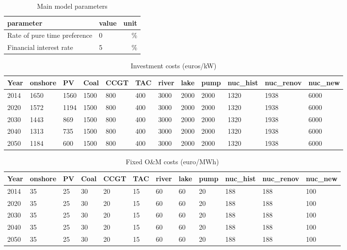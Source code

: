 \begin{table}[!ht]
	\centering
	\caption{Main model parameters}
	\begin{tabular}{llr}
		\toprule
		parameter&value&unit\\
		\midrule
		Rate of pure time preference &0&\%\\
		Financial interest rate&5&\%\\
		\bottomrule
	\end{tabular}
\end{table}

\begin{table}[!ht]
	\centering
	\caption{Investment costs (euros/kW)}
	\label{tab:Investment _costs}
	\begin{adjustbox}{width=1\textwidth}
	\small
	\begin{tabular}{llllllllllll}
		\toprule
		 Year & onshore & PV & Coal & CCGT & TAC & river & lake & pump & nuc\_hist & nuc\_renov & nuc\_new \\
		\midrule
		2014 & 1650 & 1560 & 1500 & 800 & 400 & 3000 & 2000 & 2000 & 1320 & 1938 & 6000 \\
		2020 & 1572 & 1194 & 1500 & 800 & 400 & 3000 & 2000 & 2000 & 1320 & 1938 & 6000 \\
		2030 & 1443 & 869 & 1500 & 800 & 400 & 3000 & 2000 & 2000 & 1320 & 1938 & 6000 \\
		2040 & 1313 & 735 & 1500 & 800 & 400 & 3000 & 2000 & 2000 & 1320 & 1938 & 6000 \\
		2050 & 1184 & 600 & 1500 & 800 & 400 & 3000 & 2000 & 2000 & 1320 & 1938 & 6000 \\
		\bottomrule
	\end{tabular}
\end{adjustbox}
\end{table}

\begin{table}[!ht]
	\centering
	\caption{Fixed O\&M costs (euro/MWh)}
	\label{tab:OM_costs}
		\begin{adjustbox}{width=1\textwidth}
	\small
	\begin{tabular}{llllllllllll}
		\toprule
		Year & onshore & PV & Coal & CCGT & TAC & river & lake & pump & nuc\_hist & nuc\_renov & nuc\_new \\
		\midrule
		2014 & 35 & 25 & 30 & 20 & 15 & 60 & 60 & 20 & 188 & 188 & 100 \\
		2020 & 35 & 25 & 30 & 20 & 15 & 60 & 60 & 20 & 188 & 188 & 100 \\
		2030 & 35 & 25 & 30 & 20 & 15 & 60 & 60 & 20 & 188 & 188 & 100 \\
		2040 & 35 & 25 & 30 & 20 & 15 & 60 & 60 & 20 & 188 & 188 & 100 \\
		2050 & 35 & 25 & 30 & 20 & 15 & 60 & 60 & 20 & 188 & 188 & 100 \\
		\bottomrule
	\end{tabular}
\end{adjustbox}
\end{table}



